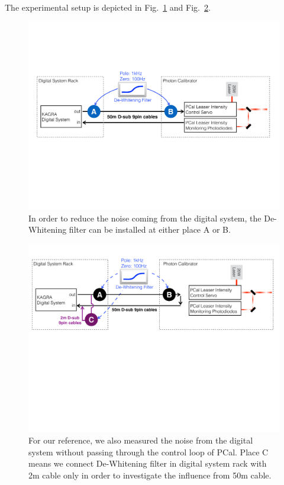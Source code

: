 The experimental setup is depicted in Fig.~\ref{fig:dew_setup} and Fig.~\ref{fig:dew_setup2m}.\\

\begin{figure}[hbt!]
\centering
\includegraphics[width=1\textwidth]{figure/dew_setup.pdf}
\caption[Noise Measurement Setup]{In order to reduce the noise coming from the digital system, the De-Whitening filter can be installed at either place A or B.    }
\label{fig:dew_setup}
\end{figure}

\begin{figure}[hbt!]
\centering
\includegraphics[width=1\textwidth]{figure/dew_setup2m.pdf}
\caption[Noise Measurement Setup]{For our reference, we also measured the noise from the digital system without passing through the control loop of PCal. Place C means we connect De-Whitening filter in digital system rack with 2m cable only in order to investigate the influence from 50m cable.}
\label{fig:dew_setup2m}
\end{figure}


